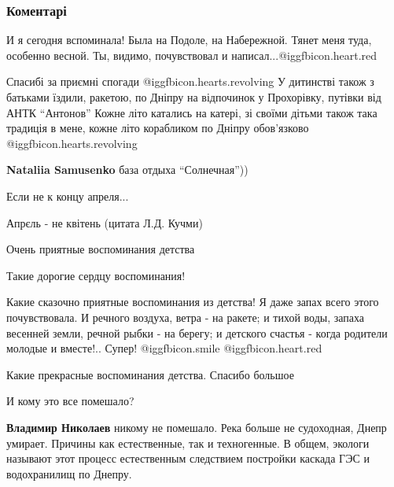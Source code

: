  
 
 
 
 
\subsubsection{Коментарі}

\begin{itemize} %
И я сегодня вспоминала! Была на Подоле, на Набережной. Тянет меня туда,
особенно весной. Ты, видимо, почувствовал и написал...@igg{fbicon.heart.red}

Спасибі за приємні спогади @igg{fbicon.hearts.revolving} 
У дитинстві також з батьками їздили, ракетою, по Дніпру на відпочинок у Прохорівку, путівки від АНТК \enquote{Антонов}
Кожне літо катались на катері, зі своїми дітьми також така традиція в мене, кожне літо корабликом по Дніпру обов'язково @igg{fbicon.hearts.revolving} 

\textbf{Nataliia Samusenko} база отдыха \enquote{Солнечная}))

Если не к концу апреля...

Апрєль - не квітень (цитата Л.Д. Кучми)

Очень приятные воспоминания детства

Такие дорогие сердцу воспоминания!


Какие сказочно приятные воспоминания из детства! Я даже запах всего этого
почувствовала. И речного воздуха, ветра - на ракете; и тихой воды, запаха
весенней земли, речной рыбки - на берегу; и детского счастья - когда родители
молодые и вместе!.. Супер!  @igg{fbicon.smile} @igg{fbicon.heart.red}

Какие прекрасные воспоминания детства. Спасибо большое

И кому это все помешало?

\begin{itemize} %
\textbf{Владимир Николаев} никому не помешало. Река больше не судоходная, Днепр умирает. Причины как естественные, так и техногенные. В общем, экологи называют этот процесс естественным следствием постройки каскада ГЭС и водохранилищ по Днепру.


\end{itemize}
\end{itemize}
